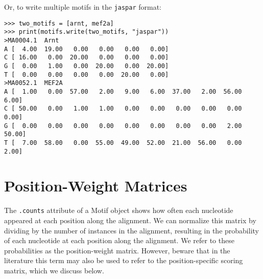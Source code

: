 Or, to write multiple motifs in the \verb+jaspar+ format:
\begin{verbatim}
>>> two_motifs = [arnt, mef2a]
>>> print(motifs.write(two_motifs, "jaspar"))
>MA0004.1  Arnt
A [  4.00  19.00   0.00   0.00   0.00   0.00]
C [ 16.00   0.00  20.00   0.00   0.00   0.00]
G [  0.00   1.00   0.00  20.00   0.00  20.00]
T [  0.00   0.00   0.00   0.00  20.00   0.00]
>MA0052.1  MEF2A
A [  1.00   0.00  57.00   2.00   9.00   6.00  37.00   2.00  56.00   6.00]
C [ 50.00   0.00   1.00   1.00   0.00   0.00   0.00   0.00   0.00   0.00]
G [  0.00   0.00   0.00   0.00   0.00   0.00   0.00   0.00   2.00  50.00]
T [  7.00  58.00   0.00  55.00  49.00  52.00  21.00  56.00   0.00   2.00]
\end{verbatim}

\section{Position-Weight Matrices}

The \verb+.counts+ attribute of a Motif object shows how often each
nucleotide appeared at each position along the alignment. We can
normalize this matrix by dividing by the number of instances in the
alignment, resulting in the probability of each nucleotide at each
position along the alignment. We refer to these probabilities as
the position-weight matrix. However, beware that in the literature
this term may also be used to refer to the position-specific scoring
matrix, which we discuss below.

